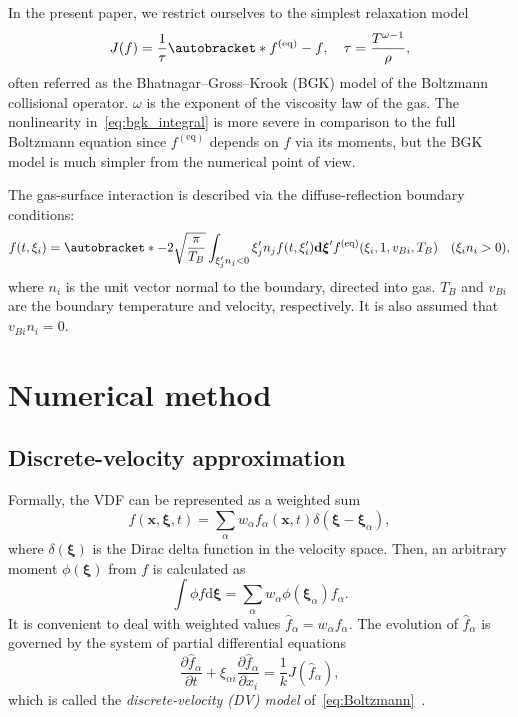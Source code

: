 \documentclass{article}
\newcommand{\dd}{\mathrm{d}}
\newcommand{\pder}[2][]{\frac{\partial#1}{\partial#2}}
\DeclarePairedDelimiter\autobracket()       %
\newcommand{\br}[1]{\autobracket*{#1}}
\newcommand{\dxi}{\boldsymbol{\dd\xi}}
\newcommand{\bxi}{{\boldsymbol{\xi}}}
\newcommand{\bxia}{\bxi_\alpha}
\newcommand{\bx}{\boldsymbol{x}}
\newcommand{\xiai}{\xi_{\alpha i}}
\newcommand{\equil}[1]{#1^\mathrm{(eq)}}
\begin{document}
In the present paper, we restrict ourselves to the simplest relaxation model~\cite{Krook1954, Welander1954}
\begin{equation}\label{eq:bgk_integral}
    J(f) = \frac1\tau\br{\equil{f}-f}, \quad \tau = \frac{T^{\omega-1}}{\rho},
\end{equation}
often referred as the Bhatnagar--Gross--Krook (BGK) model of the Boltzmann collisional operator.
\(\omega\) is the exponent of the viscosity law of the gas.
The nonlinearity in~\eqref{eq:bgk_integral} is more severe in comparison to the full Boltzmann equation
since \(\equil{f}\) depends on \(f\) via its moments,
but the BGK model is much simpler from the numerical point of view.

The gas-surface interaction is described via the diffuse-reflection boundary conditions:
\begin{equation}\label{eq:diffuse}
    f(t,\xi_i) = \br{-2\sqrt\frac\pi{T_B} \int_{\xi'_jn_j<0}\xi'_jn_jf(t,\xi'_i)\dxi'}
        \equil{f}(\xi_i,1,v_{Bi},T_B) \quad (\xi_in_i>0),
\end{equation}
where \(n_i\) is the unit vector normal to the boundary, directed into gas.
\(T_B\) and \(v_{Bi}\) are the boundary temperature and velocity, respectively.
It is also assumed that \(v_{Bi}n_i = 0\).

\section{Numerical method}

\subsection{Discrete-velocity approximation}\label{sec:dv}

Formally, the VDF can be represented as a weighted sum
\begin{equation}\label{eq:discrete_velocity}
    f(\bx,\bxi,t) = \sum_\alpha w_\alpha f_\alpha(\bx,t)\delta(\bxi-\bxia),
\end{equation}
where \(\delta(\bxi)\) is the Dirac delta function in the velocity space.
Then, an arbitrary moment \(\phi(\bxi)\) from \(f\) is calculated as
\begin{equation}\label{eq:cubature}
    \int \phi f\dxi = \sum_\alpha w_\alpha \phi(\bxia) f_\alpha.
\end{equation}
It is convenient to deal with weighted values \(\hat{f}_\alpha = w_\alpha f_\alpha\).
The evolution of \(\hat{f}_\alpha\) is governed by the system of partial differential equations
\begin{equation}\label{eq:dvm}
    \pder[\hat{f}_\alpha]{t} + \xiai\pder[\hat{f}_\alpha]{x_i} = \frac1kJ(\hat{f}_\alpha),
\end{equation}
which is called the \emph{discrete-velocity (DV) model} of~\eqref{eq:Boltzmann}~\cite{Cabannes1980}.
\end{document}
